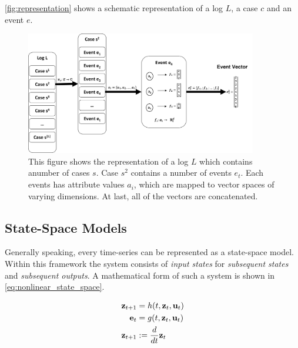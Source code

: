\documentclass[./../../paper.tex]{subfiles}
\begin{document}
\autoref{fig:representation} shows a schematic representation of a log $L$, a case $c$ and an event $e$.


\begin{figure}[htb]
    \centering
    \includegraphics[width=0.9\textwidth]{figures/Graphics/Slide4.PNG}
    \caption{This figure shows the representation of a log $L$ which contains anumber of cases $s$. Case $s^2$ contains a number of events $e_t$. Each events has attribute values $a_i$, which are mapped to vector spaces of varying dimensions. At last, all of the vectors are concatenated.}
    \label{fig:representation}
\end{figure}




\subsection{State-Space Models}
Generally speaking, every time-series can be represented as a state-space model\autocite{kalman_NewApproachLinear_1960}. Within this framework the system consists of \emph{input states} for \emph{subsequent states} and \emph{subsequent outputs}. A mathematical form of such a system is shown in \autoref{eq:nonlinear_state_space}.

\begin{align}
    \label{eq:nonlinear_state_space}
    \mathbf{z}_{t+1} & =h(t, \mathbf{z}_t, \mathbf{u}_t)           \\
    \mathbf{e}_t   & =g(t, \mathbf{z}_t, \mathbf{u}_t) \nonumber \\
    \mathbf{z}_{t+1} &:=\frac{d}{d t} \mathbf{z}_t \nonumber
\end{align}
\end{document}

